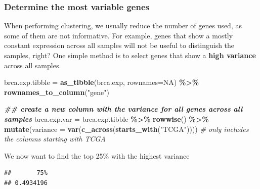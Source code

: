 \documentclass[
]{book}
\newenvironment{Shaded}{\begin{snugshade}}{\end{snugshade}}
\newcommand{\AttributeTok}[1]{\textcolor[rgb]{0.13,0.29,0.53}{#1}}
\newcommand{\CommentTok}[1]{\textcolor[rgb]{0.56,0.35,0.01}{\textit{#1}}}
\newcommand{\ConstantTok}[1]{\textcolor[rgb]{0.56,0.35,0.01}{#1}}
\newcommand{\DocumentationTok}[1]{\textcolor[rgb]{0.56,0.35,0.01}{\textbf{\textit{#1}}}}
\newcommand{\FloatTok}[1]{\textcolor[rgb]{0.00,0.00,0.81}{#1}}
\newcommand{\FunctionTok}[1]{\textcolor[rgb]{0.13,0.29,0.53}{\textbf{#1}}}
\newcommand{\NormalTok}[1]{#1}
\newcommand{\OtherTok}[1]{\textcolor[rgb]{0.56,0.35,0.01}{#1}}
\newcommand{\SpecialCharTok}[1]{\textcolor[rgb]{0.81,0.36,0.00}{\textbf{#1}}}
\newcommand{\StringTok}[1]{\textcolor[rgb]{0.31,0.60,0.02}{#1}}
\begin{document}
\hypertarget{determine-the-most-variable-genes}{%
\subsubsection{Determine the most variable genes}\label{determine-the-most-variable-genes}}

When performing clustering, we usually reduce the number of genes used, as some of them are not informative. For example, genes that show a mostly constant expression across all samples will not be useful to distinguish the samples, right? One simple method is to select genes that show a \textbf{high variance} across all samples.

\begin{Shaded}
\begin{Highlighting}[]
\NormalTok{brca.exp.tibble }\OtherTok{=} \FunctionTok{as\_tibble}\NormalTok{(brca.exp, }\AttributeTok{rownames=}\ConstantTok{NA}\NormalTok{) }\SpecialCharTok{\%\textgreater{}\%}
  \FunctionTok{rownames\_to\_column}\NormalTok{(}\StringTok{"gene"}\NormalTok{)}

\DocumentationTok{\#\# create a new column with the variance for all genes across all samples}
\NormalTok{brca.exp.var }\OtherTok{=}\NormalTok{ brca.exp.tibble }\SpecialCharTok{\%\textgreater{}\%}
  \FunctionTok{rowwise}\NormalTok{() }\SpecialCharTok{\%\textgreater{}\%}
  \FunctionTok{mutate}\NormalTok{(}\AttributeTok{variance =} \FunctionTok{var}\NormalTok{(}\FunctionTok{c\_across}\NormalTok{(}\FunctionTok{starts\_with}\NormalTok{(}\StringTok{"TCGA"}\NormalTok{)))) }
\CommentTok{\# only includes the columns starting with TCGA}
\end{Highlighting}
\end{Shaded}

We now want to find the top 25\% with the highest variance

\begin{Shaded}
\end{Shaded}

\begin{verbatim}
##       75% 
## 0.4934196
\end{verbatim}
\end{document}
